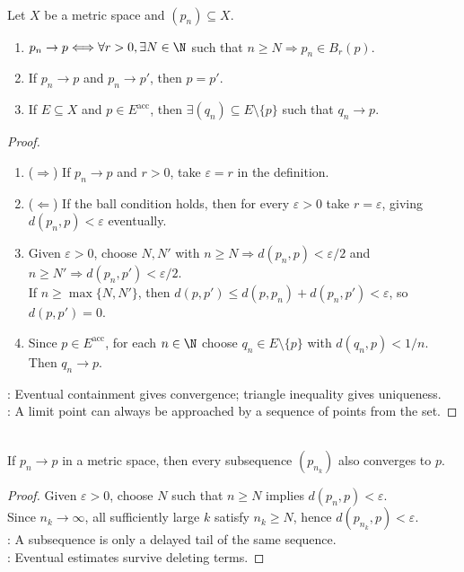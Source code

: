 \begin{theorem} \label{thm:metric-sequence-basic-properties} \\
Let $X$ be a metric space and $(p_n)\subseteq X$.
\begin{enumerate}[label=(\roman*)]
\setlength{\itemsep}{0pt}
\item $p_n\to p\Longleftrightarrow\forall r>0,\exists N\in\N$ such that $n\geq N\Longrightarrow p_n\in B_r(p)$.
\item If $p_n\to p$ and $p_n\to p'$, then $p=p'$.
\item If $E\subseteq X$ and $p\in E^{\operatorname{acc}}$, then $\exists(q_n)\subseteq E\setminus\{p\}$ such that $q_n\to p$.
\end{enumerate}
\begin{proof}
\begin{enumerate}[label=(\roman*).]
\setlength{\itemsep}{0pt}
\item[$(i)$]($\Rightarrow$) If $p_n\to p$ and $r>0$, take $\varepsilon=r$ in the definition.
\item[$(i)$]($\Leftarrow$) If the ball condition holds, then for every $\varepsilon>0$ take $r=\varepsilon$, giving $d(p_n,p)<\varepsilon$ eventually.
\item[$(ii)$] Given $\varepsilon>0$, choose $N,N'$ with $n\geq N\Longrightarrow d(p_n,p)<\varepsilon/2$ and $n\geq N'\Longrightarrow d(p_n,p')<\varepsilon/2$.\\
If $n\geq\max\{N,N'\}$, then $d(p,p')\leq d(p,p_n)+d(p_n,p')<\varepsilon$, so $d(p,p')=0$.
\item[$(iii)$] Since $p\in E^{\operatorname{acc}}$, for each $n\in\N$ choose $q_n\in E\setminus\{p\}$ with $d(q_n,p)<1/n$. Then $q_n\to p$.
\end{enumerate}
: Eventual containment gives convergence; triangle inequality gives uniqueness.\\
: A limit point can always be approached by a sequence of points from the set.
\end{proof}
\end{theorem}

\begin{corollary} \label{cor:metric-convergent-subsequences} \\
If $p_n\to p$ in a metric space, then every subsequence $(p_{n_k})$ also converges to $p$.
\begin{proof}
Given $\varepsilon>0$, choose $N$ such that $n\geq N$ implies $d(p_n,p)<\varepsilon$.\\
Since $n_k\to\infty$, all sufficiently large $k$ satisfy $n_k\geq N$, hence $d(p_{n_k},p)<\varepsilon$.\\
: A subsequence is only a delayed tail of the same sequence.\\
: Eventual estimates survive deleting terms.
\end{proof}
\end{corollary}

